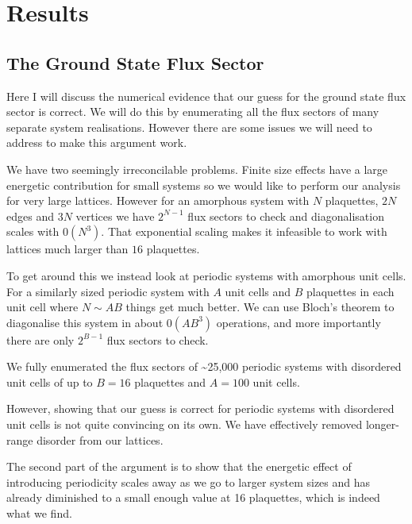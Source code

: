 \hypertarget{results}{%
\section{Results}\label{results}}

\hypertarget{the-ground-state-flux-sector}{%
\subsection{The Ground State Flux Sector}\label{the-ground-state-flux-sector}}

Here I will discuss the numerical evidence that our guess for the ground state flux sector is correct. We will do this by enumerating all the flux sectors of many separate system realisations. However there are some issues we will need to address to make this argument work.

We have two seemingly irreconcilable problems. Finite size effects have a large energetic contribution for small systems \autocite{kitaevAnyonsExactlySolved2006} so we would like to perform our analysis for very large lattices. However for an amorphous system with \(N\) plaquettes, \(2N\) edges and \(3N\) vertices we have \(2^{N-1}\) flux sectors to check and diagonalisation scales with \(\mathcal{0}(N^3)\). That exponential scaling makes it infeasible to work with lattices much larger than \(16\) plaquettes.

To get around this we instead look at periodic systems with amorphous unit cells. For a similarly sized periodic system with \(A\) unit cells and \(B\) plaquettes in each unit cell where \(N \sim AB\) things get much better. We can use Bloch's theorem to diagonalise this system in about \(\mathcal{0}(A B^3)\) operations, and more importantly there are only \(2^{B-1}\) flux sectors to check.

We fully enumerated the flux sectors of \textasciitilde25,000 periodic systems with disordered unit cells of up to \(B = 16\) plaquettes and \(A = 100\) unit cells.

However, showing that our guess is correct for periodic systems with disordered unit cells is not quite convincing on its own. We have effectively removed longer-range disorder from our lattices.

The second part of the argument is to show that the energetic effect of introducing periodicity scales away as we go to larger system sizes and has already diminished to a small enough value at 16 plaquettes, which is indeed what we find.

